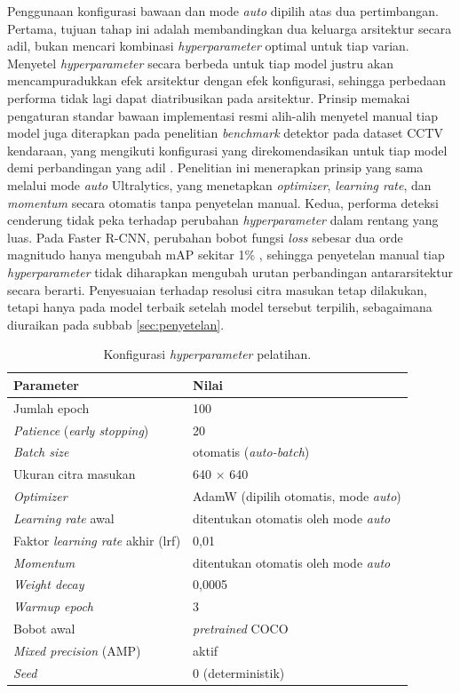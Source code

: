 Penggunaan konfigurasi bawaan dan mode \textit{auto} dipilih atas dua pertimbangan. 
Pertama, tujuan tahap ini adalah membandingkan dua keluarga arsitektur secara adil, 
bukan mencari kombinasi \textit{hyperparameter} optimal untuk tiap varian. Menyetel 
\textit{hyperparameter} secara berbeda untuk tiap model justru akan mencampuradukkan 
efek arsitektur dengan efek konfigurasi, sehingga perbedaan performa tidak lagi dapat 
diatribusikan pada arsitektur. Prinsip memakai pengaturan standar bawaan implementasi 
resmi alih-alih menyetel manual tiap model juga diterapkan pada penelitian 
\textit{benchmark} detektor pada dataset CCTV kendaraan, yang mengikuti konfigurasi yang 
direkomendasikan untuk tiap model demi perbandingan yang adil \cite{sharma2025bmd}. 
Penelitian ini menerapkan prinsip yang sama melalui mode \textit{auto} Ultralytics, yang 
menetapkan \textit{optimizer}, \textit{learning rate}, dan \textit{momentum} secara 
otomatis tanpa penyetelan manual. Kedua, performa deteksi cenderung tidak peka terhadap 
perubahan \textit{hyperparameter} dalam rentang yang luas. Pada Faster R-CNN, perubahan 
bobot fungsi \textit{loss} sebesar dua orde magnitudo hanya mengubah mAP sekitar 1\% 
\cite{ren2015faster}, sehingga penyetelan manual tiap \textit{hyperparameter} tidak 
diharapkan mengubah urutan perbandingan antararsitektur secara berarti. Penyesuaian 
terhadap resolusi citra masukan tetap dilakukan, tetapi hanya pada model 
terbaik setelah model tersebut terpilih, sebagaimana diuraikan pada subbab 
\ref{sec:penyetelan}.

\begin{table}[h]
    \centering
    \caption{Konfigurasi \textit{hyperparameter} pelatihan.}
    \label{tab:konfigurasi_latih}
    \begin{tabular}{|l|l|}
        \hline
        \textbf{Parameter} & \textbf{Nilai} \\
        \hline \hline
        Jumlah epoch & 100 \\
        \textit{Patience} (\textit{early stopping}) & 20 \\
        \textit{Batch size} & otomatis (\textit{auto-batch}) \\
        Ukuran citra masukan & 640 $\times$ 640 \\
        \textit{Optimizer} & AdamW (dipilih otomatis, mode \textit{auto}) \\
        \textit{Learning rate} awal & ditentukan otomatis oleh mode \textit{auto} \\
        Faktor \textit{learning rate} akhir (lrf) & 0,01 \\
        \textit{Momentum} & ditentukan otomatis oleh mode \textit{auto} \\
        \textit{Weight decay} & 0,0005 \\
        \textit{Warmup epoch} & 3 \\
        Bobot awal & \textit{pretrained} COCO \\
        \textit{Mixed precision} (AMP) & aktif \\
        \textit{Seed} & 0 (deterministik) \\
        \hline
    \end{tabular}
\end{table}

